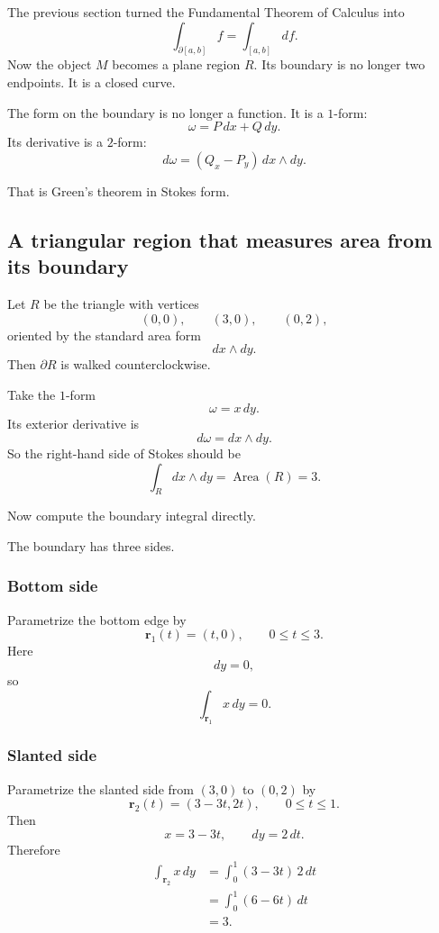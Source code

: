 The previous section turned the Fundamental Theorem of Calculus into
\[
    \int_{\partial[a,b]}f=\int_{[a,b]}df.
\]
Now the object \(M\) becomes a plane region \(R\).  Its boundary is no longer two
endpoints.  It is a closed curve.

The form on the boundary is no longer a function.  It is a \(1\)-form:
\[
    \omega=P\,dx+Q\,dy.
\]
Its derivative is a \(2\)-form:
\[
    d\omega=(Q_x-P_y)\,dx\wedge dy.
\]

That is Green's theorem in Stokes form.

\subsection{A triangular region that measures area from its boundary}

Let \(R\) be the triangle with vertices
\[
    (0,0),\qquad (3,0),\qquad (0,2),
\]
oriented by the standard area form
\[
    dx\wedge dy.
\]
Then \(\partial R\) is walked counterclockwise.

Take the \(1\)-form
\[
    \omega=x\,dy.
\]
Its exterior derivative is
\[
    d\omega=dx\wedge dy.
\]
So the right-hand side of Stokes should be
\[
    \int_R dx\wedge dy=\operatorname{Area}(R)=3.
\]

Now compute the boundary integral directly.

The boundary has three sides.

\subsubsection*{Bottom side}

Parametrize the bottom edge by
\[
    \mathbf r_1(t)=(t,0),
    \qquad
    0\le t\le3.
\]
Here
\[
    dy=0,
\]
so
\[
    \int_{\mathbf r_1}x\,dy=0.
\]

\subsubsection*{Slanted side}

Parametrize the slanted side from \((3,0)\) to \((0,2)\) by
\[
    \mathbf r_2(t)=(3-3t,2t),
    \qquad
    0\le t\le1.
\]
Then
\[
    x=3-3t,
    \qquad
    dy=2\,dt.
\]
Therefore
\[
\begin{aligned}
    \int_{\mathbf r_2}x\,dy
    &=
    \int_0^1 (3-3t)\,2\,dt\\
    &=
    \int_0^1 (6-6t)\,dt\\
    &=
    3.
\end{aligned}
\]

